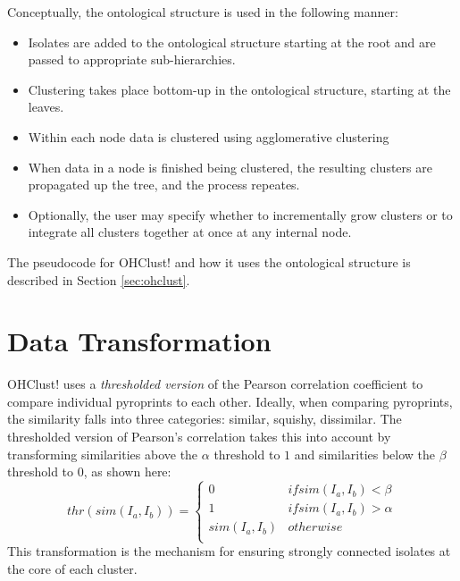 \documentclass[12pt]{ucthesis}
\begin{document}
      Conceptually, the ontological structure is used in the following manner:
      \begin{itemize}
         \item Isolates are added to the ontological structure starting at the
               root and are passed to appropriate sub-hierarchies.
         \item Clustering takes place bottom-up in the ontological structure,
               starting at the leaves.
         \item Within each node data is clustered using \textsf{agglomerative
               clustering}
         \item When data in a node is finished being clustered, the resulting
               clusters are propagated up the tree, and the process repeates.
         \item Optionally, the user may specify whether to incrementally grow
               clusters or to integrate all clusters together at once at any
               internal node.
      \end{itemize}
      The pseudocode for \textsf{OHClust!} and how it uses the ontological structure is
      described in Section \ref{sec:ohclust}.

   \section{Data Transformation}
      \textsf{OHClust!} uses a \textit{thresholded version} of the Pearson
      correlation coefficient to compare individual pyroprints to each other.
      Ideally, when comparing pyroprints, the similarity falls into three
      categories: similar, squishy, dissimilar. The thresholded version of
      Pearson's correlation takes this into account by transforming
      similarities above the $\alpha$ threshold to $1$ and similarities below
      the $\beta$ threshold to $0$, as shown here:
      $$
         thr(sim(I_{a}, I_{b})) = \begin{cases}
                              0 & if sim(I_{a}, I_{b}) < \beta \\
                              1 & if sim(I_{a}, I_{b}) > \alpha \\
                              sim(I_{a}, I_{b}) & otherwise \\
                              \end{cases}
      $$
      This transformation is the mechanism for ensuring strongly connected
      isolates at the core of each cluster.
\end{document}
